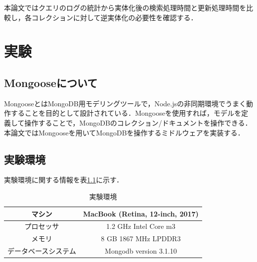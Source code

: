\documentclass[a4paper,11pt]{ujreport}
\begin{document}
本論文ではクエリのログの統計から実体化後の検索処理時間と更新処理時間を比較し，各コレクションに対して逆実体化の必要性を確認する．

\chapter{実験}
\label{chap:Experiment}
\section{Mongooseについて}
MongooseとはMongoDB用モデリングツールで，Node.jsの非同期環境でうまく動作することを目的として設計されている．Mongooseを使用すれば，モデルを定義して操作することで，MongoDBのコレクション/ドキュメントを操作できる\cite{mongoose}．本論文ではMongooseを用いてMongoDBを操作するミドルウェアを実装する．

\section{実験環境}
実験環境に関する情報を表\ref{table:experiment_env}に示す．
\begin{table}[htb]
  \begin{center}
    \caption{実験環境}
		\label{table:experiment_env}
    \begin{tabular}{|c|c|} \hline
      マシン & MacBook (Retina, 12-inch, 2017) \\ \hline
      プロセッサ & 1.2 GHz Intel Core m3\\ \hline
      メモリ & 8 GB 1867 MHz LPDDR3\\ \hline
      データベースシステム & Mongodb version 3.1.10\\ \hline
    \end{tabular}
  \end{center}
\end{table}
\end{document}
